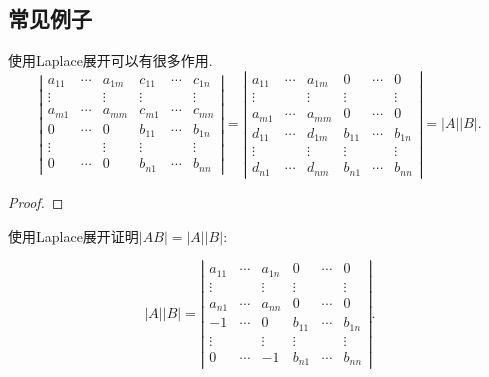 \subsection{常见例子}
\begin{prob} 
    使用Laplace展开可以有很多作用. 
$$
\left|\begin{array}{cccccc}
    a_{11} & \cdots & a_{1 m} & c_{11} & \cdots & c_{1 n} \\
    \vdots & & \vdots & \vdots & & \vdots \\
    a_{m 1} & \cdots & a_{m m} & c_{m 1} & \cdots & c_{m n} \\
    0 & \cdots & 0 & b_{11} & \cdots & b_{1 n} \\
    \vdots & & \vdots & \vdots & & \vdots \\
    0 & \cdots & 0 & b_{n 1} & \cdots & b_{n n}
    \end{array}\right|=\left|\begin{array}{cccccc}
    a_{11} & \cdots & a_{1 m} & 0 & \cdots & 0 \\
    \vdots & & \vdots & \vdots & & \vdots \\
    a_{m 1} & \cdots & a_{m m} & 0 & \cdots & 0 \\
    d_{11} & \cdots & d_{1 m} & b_{11} & \cdots & b_{1 n} \\
    \vdots & & \vdots & \vdots & & \vdots \\
    d_{n 1} & \cdots & d_{n m} & b_{n 1} & \cdots & b_{n n}
    \end{array}\right|=|A||B| .
$$ 
\end{prob} 

\begin{proof} 
 
 
\end{proof} 



\begin{prob} 

    使用Laplace展开证明$|AB|=|A||B|$:

    $$
    |A||B|=\left|\begin{array}{cccccc}
        a_{11} & \cdots & a_{1 n} & 0 & \cdots & 0 \\
        \vdots & & \vdots & \vdots & & \vdots \\
        a_{n 1} & \cdots & a_{n n} & 0 & \cdots & 0 \\
        -1 & \cdots & 0 & b_{11} & \cdots & b_{1 n} \\
        \vdots & & \vdots & \vdots & & \vdots \\
        0 & \cdots & -1 & b_{n 1} & \cdots & b_{n n}
        \end{array}\right| .
    $$

\end{prob} 

